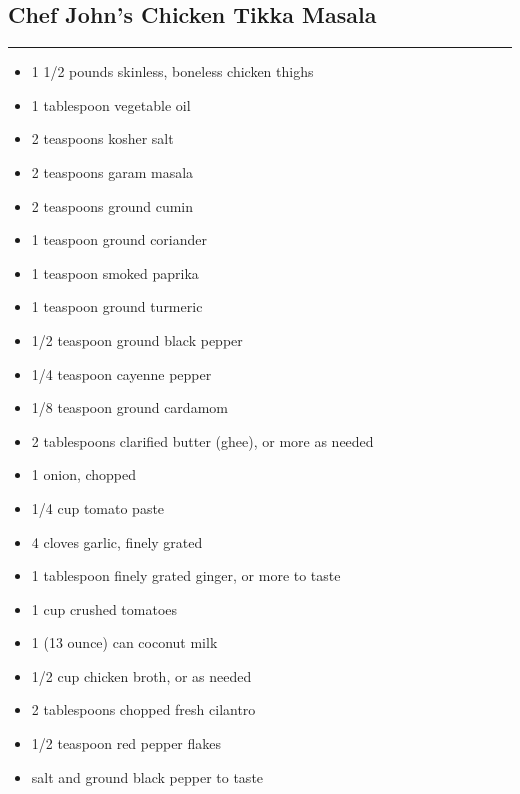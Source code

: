 \documentclass{article}
\begin{document}
\subsection{Chef John's Chicken Tikka Masala} 
\noindent\rule[0.5ex]{\linewidth}{1pt}

\begin{framed}
\begin{itemize}
    \item 1 1/2 pounds skinless, boneless chicken thighs
    \item 1 tablespoon vegetable oil
    \item 2 teaspoons kosher salt
    \item 2 teaspoons garam masala
    \item 2 teaspoons ground cumin
    \item 1 teaspoon ground coriander
    \item 1 teaspoon smoked paprika
    \item 1 teaspoon ground turmeric
    \item 1/2 teaspoon ground black pepper
    \item 1/4 teaspoon cayenne pepper
    \item 1/8 teaspoon ground cardamom
    \item 2 tablespoons clarified butter (ghee), or more as needed
    \item 1 onion, chopped
    \item 1/4 cup tomato paste
    \item 4 cloves garlic, finely grated
    \item 1 tablespoon finely grated ginger, or more to taste
    \item 1 cup crushed tomatoes
    \item 1 (13 ounce) can coconut milk
    \item 1/2 cup chicken broth, or as needed
    \item 2 tablespoons chopped fresh cilantro
    \item 1/2 teaspoon red pepper flakes
    \item salt and ground black pepper to taste
\end{itemize}
\end{framed}
\end{document}
